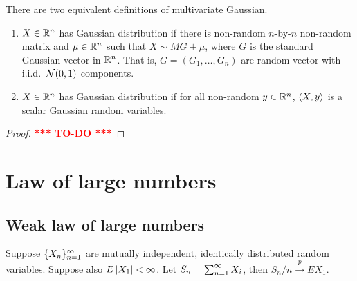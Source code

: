 \documentclass[a4paper]{article}
\newcommand{\convp}{\xrightarrow{p}}
\newcommand{\TODO}{\textcolor{red}{\textbf{*** TO-DO ***}}}
\begin{document}
\begin{defi}
  There are two equivalent definitions of multivariate Gaussian.
  \begin{enumerate}
    \item $X \in \mathbb{R}^n$ has Gaussian distribution if there is non-random
          $n$-by-$n$ non-random matrix and $\mu \in \mathbb{R}^n$ such that
          $X \sim M G + \mu$, where $G$ is the standard Gaussian vector in $\mathbb{R}^n$.
          That is, $G = (G_1, \dots, G_n)$ are random vector with
          i.i.d.\ $\mathcal{N}(0, 1)$ components.

    \item $X \in \mathbb{R}^n$ has Gaussian distribution if for all
          non-random $y \in \mathbb{R}^n$, $\left\langle X, y \right\rangle$ is a scalar
          Gaussian random variables.
  \end{enumerate}
\end{defi}

\begin{proof}
  \TODO

\end{proof}

\section{Law of large numbers}

\subsection{Weak law of large numbers}

\begin{thm}
  Suppose $\{ X_n \}_{n=1}^\infty$ are mutually independent, identically
  distributed random variables. Suppose also $E \left\lvert X_1\right\rvert < \infty$.
  Let $S_n = \sum_{n=1}^\infty X_i$, then $S_n / n \convp E X_1$.
\end{thm}
\end{document}
